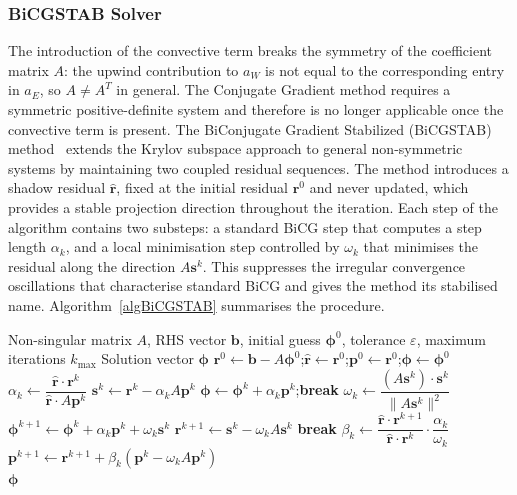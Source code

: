 \subsubsection{BiCGSTAB Solver}
The introduction of the convective term breaks the symmetry of the coefficient matrix $A$: the upwind contribution to $a_W$ is not equal to the corresponding entry in $a_E$, so $A \neq A^T$ in general. The Conjugate Gradient method requires a symmetric positive-definite system and therefore is no longer applicable once the convective term is present. The BiConjugate Gradient Stabilized (BiCGSTAB) method~\cite{vanderVorst1992} extends the Krylov subspace approach to general non-symmetric systems by maintaining two coupled residual sequences. The method introduces a shadow residual $\hat{\mathbf{r}}$, fixed at the initial residual $\mathbf{r}^0$ and never updated, which provides a stable projection direction throughout the iteration. Each step of the algorithm contains two substeps: a standard BiCG step that computes a step length $\alpha_k$, and a local minimisation step controlled by $\omega_k$ that minimises the residual along the direction $A\mathbf{s}^k$. This suppresses the irregular convergence oscillations that characterise standard BiCG and gives the method its stabilised name. Algorithm~\ref{algBiCGSTAB} summarises the procedure.

\begin{algorithm}[ht]
\caption{BiConjugate Gradient Stabilized (BiCGSTAB) solver}
\label{algBiCGSTAB}
\begin{algorithmic}[1]
    \Require Non-singular matrix $A$, RHS vector $\mathbf{b}$, initial guess $\boldsymbol{\phi}^0$, tolerance $\varepsilon$, maximum iterations $k_{\max}$
    \Ensure Solution vector $\boldsymbol{\phi}$
    \State $\mathbf{r}^0 \gets \mathbf{b} - A\boldsymbol{\phi}^0$;\quad $\hat{\mathbf{r}} \gets \mathbf{r}^0$;\quad $\mathbf{p}^0 \gets \mathbf{r}^0$;\quad $\boldsymbol{\phi} \gets \boldsymbol{\phi}^0$
        \State $\alpha_k \gets \dfrac{\hat{\mathbf{r}} \cdot \mathbf{r}^k}{\hat{\mathbf{r}} \cdot A\mathbf{p}^k}$
        \State $\mathbf{s}^k \gets \mathbf{r}^k - \alpha_k A\mathbf{p}^k$
            \State $\boldsymbol{\phi} \gets \boldsymbol{\phi}^k + \alpha_k\mathbf{p}^k$;\quad \textbf{break}
        \EndIf
        \State $\omega_k \gets \dfrac{(A\mathbf{s}^k) \cdot \mathbf{s}^k}{\|A\mathbf{s}^k\|^2}$
        \State $\boldsymbol{\phi}^{k+1} \gets \boldsymbol{\phi}^k + \alpha_k\mathbf{p}^k + \omega_k\mathbf{s}^k$
        \State $\mathbf{r}^{k+1} \gets \mathbf{s}^k - \omega_k A\mathbf{s}^k$
            \State \textbf{break}
        \EndIf
        \State $\beta_k \gets \dfrac{\hat{\mathbf{r}} \cdot \mathbf{r}^{k+1}}{\hat{\mathbf{r}} \cdot \mathbf{r}^k} \cdot \dfrac{\alpha_k}{\omega_k}$
        \State $\mathbf{p}^{k+1} \gets \mathbf{r}^{k+1} + \beta_k(\mathbf{p}^k - \omega_k A\mathbf{p}^k)$
    \EndFor \\
    \Return $\boldsymbol{\phi}$
\end{algorithmic}
\end{algorithm}

